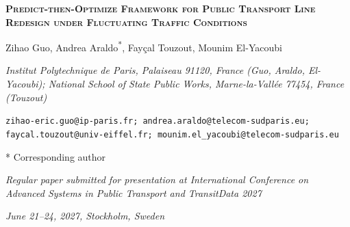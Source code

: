 \documentclass[11pt,a4paper]{article} %
\author{}
\date{}
\begin{document}
{\centering
{\fontsize{16}{19}\selectfont\textbf{\textsc{Predict-then-Optimize Framework for Public Transport Line Redesign under Fluctuating Traffic Conditions}}}\par
\vspace{16pt}
Zihao Guo, Andrea Araldo\textsuperscript{*}, Fay\c{c}al Touzout, Mounim El-Yacoubi\par
\textit{Institut Polytechnique de Paris, Palaiseau 91120, France (Guo, Araldo, El-Yacoubi); National School of State Public Works, Marne-la-Vall\'{e}e 77454, France (Touzout)}\par
\texttt{zihao-eric.guo@ip-paris.fr; andrea.araldo@telecom-sudparis.eu; faycal.touzout@univ-eiffel.fr; mounim.el\_yacoubi@telecom-sudparis.eu}\par
* Corresponding author\par
\vspace{12pt}
\emph{Regular paper submitted for presentation at International Conference on Advanced Systems in Public Transport and TransitData 2027}\par
\emph{June 21--24, 2027, Stockholm, Sweden}\par
\vspace{12pt}}
\end{document}
